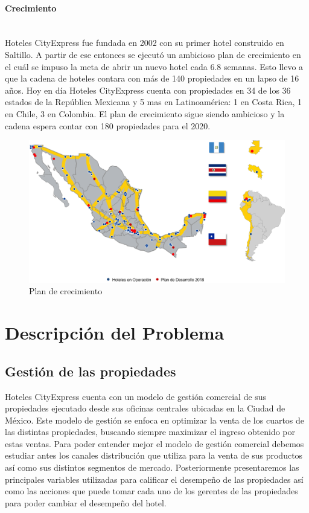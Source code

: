 \documentclass{article}\usepackage[]{graphicx}\usepackage[]{color}
\begin{document}
\paragraph {Crecimiento} ~ \\
Hoteles CityExpress fue fundada en 2002 con su primer hotel construido en Saltillo. A partir de ese entonces se ejecutó un ambicioso plan de crecimiento en el cuál se impuso la meta de abrir un nuevo hotel cada 6.8 semanas. Esto llevo a que la cadena de hoteles contara con más de 140 propiedades en un lapso de 16 años.
Hoy en día Hoteles CityExpress cuenta con propiedades en 34 de los 36 estados de la República Mexicana y 5 mas en Latinoamérica: 1 en Costa Rica, 1 en Chile, 3 en Colombia. El plan de crecimiento sigue siendo ambicioso y la cadena espera contar con 180 propiedades para el 2020.
\begin{figure}[!]
  \includegraphics[width=\linewidth]{Imagenes/Ubicaciones.png}
  \caption{Plan de crecimiento}
  \label{fig:crecimiento}
\end{figure}
\section{Descripción del Problema}
\subsection{Gestión de las propiedades}
Hoteles CityExpress cuenta con un modelo de gestión comercial de sus propiedades ejecutado desde sus oficinas centrales ubicadas en la Ciudad de México. Este modelo de gestión se enfoca en optimizar la venta de los cuartos de las distintas propiedades, buscando siempre maximizar el ingreso obtenido por estas ventas.
Para poder entender mejor el modelo de gestión comercial debemos estudiar antes los canales distribución que utiliza para la venta de sus productos así como sus distintos segmentos de mercado. Posteriormente presentaremos las principales variables utilizadas para calificar el desempeño de las propiedades así como las acciones que puede tomar cada uno de los gerentes de las propiedades para poder cambiar el desempeño del hotel.
\end{document}
